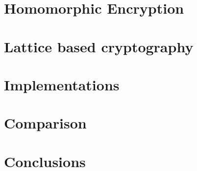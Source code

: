 \documentclass[11pt,a4paper]{article}
\theoremstyle{plain}
\theoremstyle{definition}
\theoremstyle{remark}
\begin{document}
\section{Homomorphic Encryption}


\section{Lattice based cryptography}


\section{Implementations}


\section{Comparison}


\section{Conclusions}


\newpage
\printbibliography
{}
\end{document}
